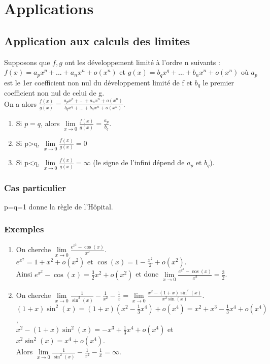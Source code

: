 \documentclass[a4paper,10pt]{book} %
\newcommand{\dl}{développement limité }
\begin{document}
\newpage

\section{Applications}
\subsection{Application aux calculs des limites}
Supposons que $f,g$ ont les \dl à l'ordre n suivants :\\
$f(x)=a_px^p+...+a_nx^n+o(x^n)$ et $g(x)=b_qx^q+...+b_nx^n+o(x^n)$ où $a_p$ est le 1er coefficient non nul du \dl de f et $b_q$ le premier coefficient non nul de celui de g.\\

On a alors $\displaystyle \frac{f(x)}{g(x)}=\frac{a_px^p+...+a_nx^n+o(x^n)}{b_qx^q+...+b_nx^n+o(x^n)}$.\\

\begin{enumerate}
\item Si $p=q$, alors $\lim\limits_{x\rightarrow 0}\frac{f(x)}{g(x)}=\frac{a_p}{b_q}$.
\item Si p>q, $\lim\limits_{x\rightarrow 0}\frac{f(x)}{g(x)}=0$
\item Si p<q, $\lim\limits_{x\rightarrow 0}\frac{f(x)}{g(x)}=\infty$ (le signe de l'infini dépend de $a_p$ et $b_q$).
\end{enumerate}

\subsubsection{Cas particulier}
p=q=1 donne la règle de l'Hôpital.

\subsubsection{Exemples}
\begin{enumerate}
\item On cherche $\lim\limits_{x\rightarrow 0}\frac{e^{x^2}-\cos(x)}{x^2}$.\\
$e^{x^2}=1+x^2+o(x^2)$ et $\cos(x)=1-\frac{x^2}{2}+o(x^2)$.\\
Ainsi $e^{x^2}-\cos(x)=\frac{3}{2}x^2+o(x^2)$ et donc $\lim\limits_{x\rightarrow 0}\frac{e^{x^2}-\cos(x)}{x^2}= \frac{3}{2}$.\\

\item On cherche $\lim\limits_{x\rightarrow 0}\frac{1}{\sin^2(x)}-\frac{1}{x^2}-\frac{1}{x}=\lim\limits_{x\rightarrow 0}\frac{x^2-(1+x)\sin^2(x)}{x^2\sin(x)}$.\\

$(1+x)\sin^2(x)=(1+x)(x^2-\frac{1}{3}x^4)+o(x^4)=x^2+x^3-\frac{1}{3}x^4+o(x^4)$,\\  $x^2-(1+x)\sin^2(x)=-x^3+\frac{1}{3}x^4+o(x^4)$ et $x^2\sin^2(x)=x^4+o(x^4)$.\\

Alors $\lim\limits_{x\rightarrow 0}\frac{1}{\sin^2(x)}-\frac{1}{x^2}-\frac{1}{x}=\infty$.
\end{enumerate}
\end{document}
